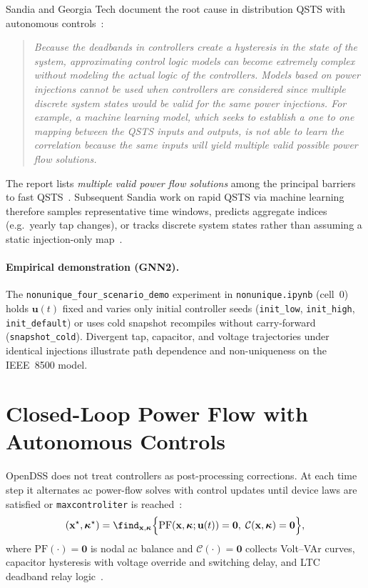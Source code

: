 \documentclass[11pt,a4paper]{article}
\begin{document}
Sandia and Georgia Tech document the root cause in distribution QSTS with
autonomous controls~\cite{deboever2017qsts}:
\begin{quote}
\emph{Because the deadbands in controllers create a hysteresis in the state of
the system, approximating control logic models can become extremely complex
without modeling the actual logic of the controllers.  Models based on power
injections cannot be used when controllers are considered since multiple discrete
system states would be valid for the same power injections.  For example, a
machine learning model, which seeks to establish a one to one mapping between
the QSTS inputs and outputs, is not able to learn the correlation because the
same inputs will yield multiple valid possible power flow solutions.}
\end{quote}
The report lists \emph{multiple valid power flow solutions} among the principal
barriers to fast QSTS~\cite{deboever2017qsts}.  Subsequent Sandia work on
rapid QSTS via machine learning therefore samples representative time windows,
predicts aggregate indices (e.g.\ yearly tap changes), or tracks discrete system
states rather than assuming a static injection-only
map~\cite{blakely2018evaluation,reno2017pvsc,reno2017vq,blakely2018isgt}.

\paragraph{Empirical demonstration (GNN2).}
The \texttt{nonunique\_four\_scenario\_demo} experiment in \texttt{nonunique.ipynb}
(cell~0) holds $\mathbf{u}(t)$ fixed and varies only initial controller seeds
(\texttt{init\_low}, \texttt{init\_high}, \texttt{init\_default}) or uses cold
snapshot recompiles without carry-forward (\texttt{snapshot\_cold}).  Divergent
tap, capacitor, and voltage trajectories under identical injections illustrate
path dependence and non-uniqueness on the IEEE~8500 model.

\section{Closed-Loop Power Flow with Autonomous Controls}
\label{sec:closedloop}

OpenDSS does not treat controllers as post-processing corrections.  At each time
step it alternates ac power-flow solves with control updates until device laws are
satisfied or \texttt{maxcontroliter} is reached~\cite{opendss,gnn2_ieee8500_avc}:
\begin{equation}
  (\mathbf{x}^\star,\boldsymbol{\kappa}^\star)=
  \find_{\mathbf{x},\boldsymbol{\kappa}}
  \Big\{
    \mathrm{PF}(\mathbf{x},\boldsymbol{\kappa};\mathbf{u}(t))=\mathbf{0},\;
    \mathcal{C}(\mathbf{x},\boldsymbol{\kappa})=\mathbf{0}
  \Big\},
  \label{eq:coupled}
\end{equation}
where $\mathrm{PF}(\cdot)=\mathbf{0}$ is nodal ac balance and
$\mathcal{C}(\cdot)=\mathbf{0}$ collects Volt--VAr curves, capacitor hysteresis
with voltage override and switching delay, and LTC deadband relay
logic~\cite{gnn2_ieee8500_avc}.
\end{document}
